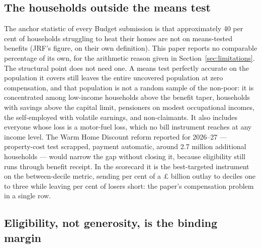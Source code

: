 \subsection{The households outside the means test}

The anchor statistic of every Budget submission is that approximately 40 per cent of households struggling to heat their homes are not on means-tested benefits (JRF's figure, on their own definition). This paper reports no comparable percentage of its own, for the arithmetic reason given in Section~\ref{sec:limitations}. The structural point does not need one. A means test perfectly accurate on the population it covers still leaves the entire uncovered population at zero compensation, and that population is not a random sample of the non-poor: it is concentrated among low-income households above the benefit taper, households with savings above the capital limit, pensioners on modest occupational incomes, the self-employed with volatile earnings, and non-claimants. It also includes everyone whose loss is a motor-fuel loss, which no bill instrument reaches at any income level. The Warm Home Discount reform reported for 2026--27 --- property-cost test scrapped, payment automatic, around 2.7 million additional households --- would narrow the gap without closing it, because eligibility still runs through benefit receipt. In the scorecard it is the best-targeted instrument on the between-decile metric, sending \genWhdShareBottomThree{} per cent of a \pounds\genWhdCostBn{} billion outlay to deciles one to three while leaving \genWhdUncompensatedShare{} per cent of losers short: the paper's compensation problem in a single row.

\subsection{Eligibility, not generosity, is the binding margin}
\label{sec:policy-eligibility}

